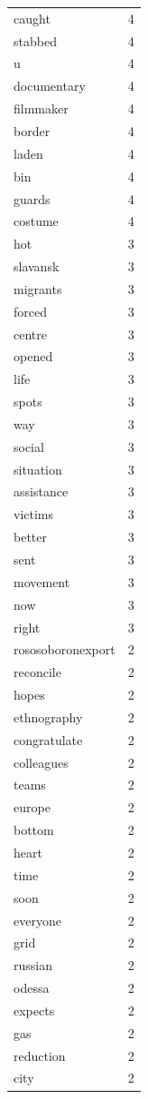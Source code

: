 \begin{tabular}{lr}
caught & 4 \\
stabbed & 4 \\
u & 4 \\
documentary & 4 \\
filmmaker & 4 \\
border & 4 \\
laden & 4 \\
bin & 4 \\
guards & 4 \\
costume & 4 \\
hot & 3 \\
slavansk & 3 \\
migrants & 3 \\
forced & 3 \\
centre & 3 \\
opened & 3 \\
life & 3 \\
spots & 3 \\
way & 3 \\
social & 3 \\
situation & 3 \\
assistance & 3 \\
victims & 3 \\
better & 3 \\
sent & 3 \\
movement & 3 \\
now & 3 \\
right & 3 \\
rososoboronexport & 2 \\
reconcile & 2 \\
hopes & 2 \\
ethnography & 2 \\
congratulate & 2 \\
colleagues & 2 \\
teams & 2 \\
europe & 2 \\
bottom & 2 \\
heart & 2 \\
time & 2 \\
soon & 2 \\
everyone & 2 \\
grid & 2 \\
russian & 2 \\
odessa & 2 \\
expects & 2 \\
gas & 2 \\
reduction & 2 \\
city & 2 \\

\end{tabular}
